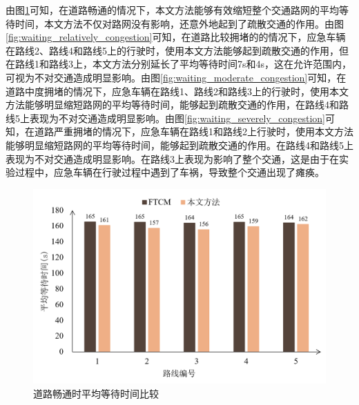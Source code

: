 由图\ref{fig:waiting_smooth}可知，在道路畅通的情况下，本文方法能够有效缩短整个交通路网的平均等待时间，本文方法不仅对路网没有影响，还意外地起到了疏散交通的作用。由图\ref{fig:waiting_relatively_congestion}可知，在道路比较拥堵的的情况下，应急车辆在路线2、路线4和路线5上的行驶时，使用本文方法能够起到疏散交通的作用，但在路线1和路线3上，本文方法分别延长了平均等待时间7s和4s，这在允许范围内，可视为不对交通造成明显影响。由图\ref{fig:waiting_moderate_congestion}可知，在道路中度拥堵的情况下，应急车辆在路线1、路线2和路线3上的行驶时，使用本文方法能够明显缩短路网的平均等待时间，能够起到疏散交通的作用，在路线4和路线5上表现为不对交通造成明显影响。由图\ref{fig:waiting_severely_congestion}可知，在道路严重拥堵的情况下，应急车辆在路线1和路线2上行驶时，使用本文方法能够明显缩短路网的平均等待时间，能够起到疏散交通的作用。在路线4和路线5上表现为不对交通造成明显影响。在路线3上表现为影响了整个交通，这是由于在实验过程中，应急车辆在行驶过程中遇到了车祸，导致整个交通出现了瘫痪。

\begin{figure}[H]
	\centering
	\includegraphics[width=\linewidth]{figures/awt1.png}
	\caption{道路畅通时平均等待时间比较}
	\label{fig:waiting_smooth}
\end{figure}



